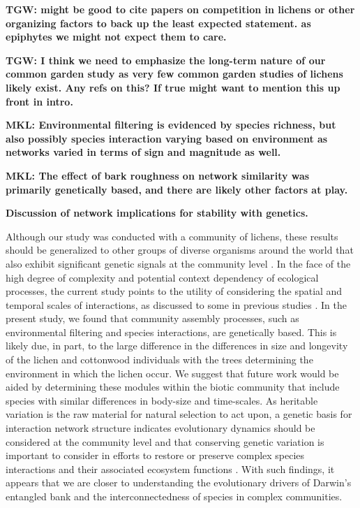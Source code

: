 \documentclass[9pt,twocolumn,twoside,lineno]{pnas-new}
\begin{document}
\textbf{TGW: might be good to cite papers on competition in lichens or
  other organizing factors to back up the least expected statement.
  as epiphytes we might not expect them to care.}

\textbf{TGW: I think we need to emphasize the long-term nature of our
  common garden study as very few common garden studies of lichens
  likely exist. Any refs on this? If true might want to mention this
  up front in intro.}

\textbf{MKL: Environmental filtering is evidenced by species richness,
  but also possibly species interaction varying based on environment
  as networks varied in terms of sign and magnitude as well.}

\textbf{MKL: The effect of bark roughness on network similarity was
  primarily genetically based, and there are likely other factors at
  play.}

\textbf{Discussion of network implications for stability with genetics.}

Although our study was conducted with a community of lichens, these
results should be generalized to other groups of diverse organisms
around the world that also exhibit significant genetic signals at the
community level \cite{Rowntree2011, Whitham2012}. In the face of the
high degree of complexity and potential context dependency of
ecological processes, the current study points to the utility of
considering the spatial and temporal scales of interactions, as
discussed to some in previous studies \cite{Bangert2006, Zook2010,
  Zytynska2012}. In the present study, we found that community
assembly processes, such as environmental filtering and species
interactions, are genetically based. This is likely due, in part, to
the large difference in the differences in size and longevity of the
lichen and cottonwood individuals with the trees determining the
environment in which the lichen occur. We suggest that future work
would be aided by determining these modules within the biotic
community that include species with similar differences in body-size
and time-scales. As heritable variation is the raw material for
natural selection to act upon, a genetic basis for interaction network
structure indicates evolutionary dynamics should be considered at the
community level and that conserving genetic variation is important to
consider in efforts to restore or preserve complex species
interactions and their associated ecosystem functions
\cite{Evans2013}.  With such findings, it appears that we are closer
to understanding the evolutionary drivers of Darwin's entangled bank
and the interconnectedness of species in complex communities.
\end{document}
